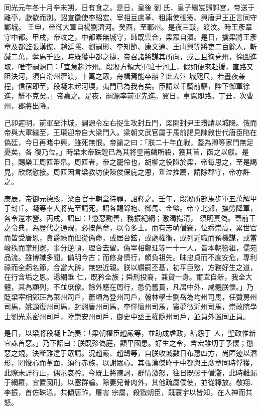 
\begin{pinyinscope}

 同光元年冬十月辛未朔，日有食之。是日，皇後
 劉
 氏、皇子繼岌歸鄴宮，帝送于離亭，歔欷而別。詔宣徽使李紹宏、宰相豆盧革、租庸使張憲、興唐尹王正言同守鄴城。
 壬申，帝御大軍自楊劉濟河。癸酉，至鄆州。是夜三鼓，渡汶。時王彥章守中都。甲戌，帝攻之，中都素無城守，師既雲合，梁眾自潰。是日，擒梁將王彥章及都監張漢傑、趙廷隱、劉嗣彬、李知節、康文通、王山興等將吏二百餘人，斬馘二萬，奪馬千匹。時既獲中都之捷，帝召諸將謀其所向，或言且徇兗州，徐圖進取，唯李嗣源曰：「宜急趨汴州。段凝方領大軍駐于河上，假如便來赴援，直路又阻決河，須自滑州濟渡，十萬之眾，舟楫焉能卒辦？此去汴
 城咫尺，若晝夜兼程，信宿即至，段凝未起河堧，夷門已為我有矣。臣請以千騎前驅，陛下御軍徐進，鮮不克矣。」帝嘉之。是夜，嗣源率前軍先進。翼日，車駕即路。丁丑，次曹州，郡將出降。



 己卯遲明，前軍至汴城，嗣源令左右捉生攻封丘門，梁開封尹王瓚請以城降。俄而帝與大軍繼至，王瓚迎帝自大梁門入。梁朝文武官屬于馬前謁見陳敘世代唐臣陷在偽廷，今日再睹中興，雖死無恨。帝諭之曰：「朕二十年血戰，蓋為卿等家門無足憂矣，各
 復乃位。」時梁末帝硃鍠已為其將皇甫麟所殺，獲其首，函之以獻。是日，賜樂工周匝幣帛。周匝者，帝之寵伶也，胡柳之役陷於梁，帝每思之，至是謁見，欣然慰接。周匝因言梁教坊使陳俊保庇之恩，垂泣推薦，請除郡守，帝亦許之。



 庚辰，帝御元德殿，梁百官于朝堂待罪，詔釋之。壬午，段凝所部馬步軍五萬解甲于封丘。凝等率大將先至請死，詔各賜錦袍、御馬、金幣。帝幸北郊，撫勞降軍，各令還本營。丙戌，詔曰：「懲惡勸善，務振紀綱；激濁揚清，
 須明真偽。蓋前王之令典，為歷代之通規，必按舊章，以令多士。而有志萌僭竊，位忝崇高，累世官而皆受唐恩，貪爵祿而但從偽命，或居台鉉，或處權衡，或列近職而預機謀，或當峻秩而掌刑憲，事分逆順，理合去留。偽宰相鄭玨等一十一人，皆本朝簪組，儒苑品流。雖博識多聞，備明今古；而修身慎行，頗負祖先。昧忠貞而不度安危，專利祿而全虧名節，合當大辟，無恕近親。朕以纘嗣丕基，初平巨憝，方務好生之道，在行含垢之恩。湯網垂
 仁，既矜全族；舜刑投裔，兼貸一身。爾宜自新，我全大體，其為顯列，不並庶僚。餘外應在周行，悉仍舊貫，凡居中外，咸體朕懷。」乃貶梁宰相鄭玨為萊州司戶，蕭頃為登州司戶，翰林學士劉岳為均州司馬，任贊房州司馬，姚顗復州司馬，封翹唐州司馬，李懌懷州司馬，竇夢徵沂州司馬，崇政院學士劉光素密州司戶，陸崇安州司戶，御史中丞王權隨州司戶，並員外置同正員。



 是日，以梁將段凝上疏奏：「梁朝權臣趙嚴等，並助成虐政，結怨于
 人，聖政惟新宜誅首惡。」乃下詔曰：朕既殄偽庭，顯平國患。好生之令，含宏雖切于予懷；懲惡之規，決斷難違于眾請。況趙嚴、趙鵠等，自朕收城數日布惠四方，尚匿迹以潛形，罔悛心而革面，須行赤族，以謝眾心。其張漢傑昨于中都與王彥章同時俘獲，此際未詳行止，偶示哀矜。今既上將陳詞，群情激怒，往日既彰于僭濫，此時難漏于網羅，宜置國刑，以塞群論。除妻兒骨肉外，其他疏屬僕使，並從釋放。敬翔、李振，首佐硃溫，共傾唐祚，屠害
 宗屬，殺戮朝臣，既寰宇以皆知，在人神而共怒。




\end{pinyinscope}
